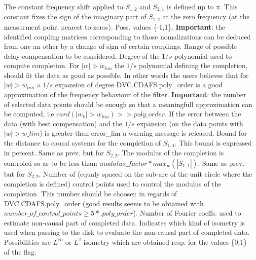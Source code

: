 {%
 The constant frequency shift applied to
$S_{1,2}$ and $S_{2,1}$ is defined up to $\pi$. This constant fixes the
sign of the imaginary part of $S_{1,2}$ at the zero frequency (at the
measurment point nearest to zeros). Poss. values \{-1,1\}. {\bf
Important}: the identified coupling matrices corresponding to those
nomalizations can be deduced from one an other by a change of sign of
certain couplings.   
 Range of possible delay compensation to
be considered. 
 Degree of the $1/s$ polynomial used to
compute completion.
 For $|w|>w_{lim}$ the $1/s$ polynomial
defining the completion, should fit the data as good as possible. In
other words the users believes that for $|w|>w_{lim}$ a $1/s$ expansion
of degree DVC.CDAFS.poly\_order is a good approximation of the frequency 
behaviour of the filter. {\bf Important}: the number of selected data
points should be enough so that a meaningfull approximation can be
computed, i.e $card(|w_k|>w_{lim})>>poly\_order$.
 If the error between the data (with best
compensation) and the $1/s$ expansion (on the data points with $|w|>w\_lim$) 
is greater than error\_lim a warning message is released.
 Bound for the distance to causal
systems for the completion of $S_{1,1}$. This bound is expressed in
percent.
 Same as prev. but for $S_{2,2}$.
 The modulus of the completion is
controled so as to be less than: $modulus\_factor * max_{w}(|S_{1,1}|)$.
 Same as prev. but for $S_{2,2}$.
 Number of (equaly spaced
on the sub-arc of the unit circle where the completion is defined) control points used to control the modulus of the completion. This number should be choosen
in regards of DVC.CDAFS.poly\_order (good results seems to be obtained
with $number\_of\_control\_points \geq 5*.poly\_order$).
 Number of Fourier
coeffs. used to estimate non-causal part of completed data.
 Indicates which kind of isometry is used
when passing to the disk to evaluate the non-causal part of completed
data. Possibilities are $L^{\infty}$ or $L^2$ isometry which are
obtained resp. for the values \{0,1\} of the flag.   
}
